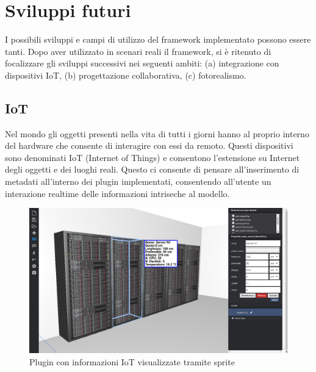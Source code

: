\section{Sviluppi futuri}
\label{sec:conclusions_section_2}

I possibili sviluppi e campi di utilizzo del framework implementato possono essere tanti.
Dopo aver utilizzato in scenari reali il framework, si è ritenuto di focalizzare gli sviluppi successivi nei seguenti ambiti:
(a) integrazione con dispositivi IoT, (b) progettazione collaborativa, (c) fotorealismo.

\subsection{IoT}
\label{sec:conclusions_section_2_sub_1}
Nel mondo gli oggetti presenti nella vita di tutti i giorni hanno al proprio interno del hardware che consente di interagire
con essi da remoto. Questi dispositivi sono denominati IoT (Internet of Things) e consentono l'estensione su Internet degli
oggetti e dei luoghi reali. Questo ci consente di pensare all'inserimento di metadati all'interno dei plugin implementati,
consentendo all'utente un interazione realtime delle informazioni intriseche al modello.\\

\begin{figure}[htbp] %
   \centering
   \includegraphics[width=1\linewidth]{images/iot}
   \caption{Plugin con informazioni IoT visualizzate tramite sprite}
   \label{fig:iot}
   \end{figure}
\newpage


